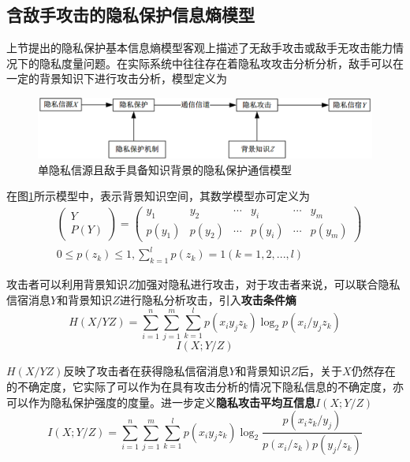 \subsection{含敌手攻击的隐私保护信息熵模型}\label{subsec:privacy-preserving-attack}

上节提出的隐私保护基本信息熵模型客观上描述了无敌手攻击或敌手无攻击能力情况下的隐私度量问题。在实际系统中往往存在着隐私攻攻击分析分析，敌手可以在一定的背景知识下进行攻击分析，模型定义为
\begin{figure}[htbp]
	\centering
	\includegraphics[width = 0.95\linewidth]{./figures/Communication-Model-for-Privacy-of-Single.png}
	\caption{单隐私信源且敌手具备知识背景的隐私保护通信模型}
	\label{fig:Communication-Model-for-Privacy-of-Single}
\end{figure}

在图\ref{fig:Communication-Model-for-Privacy-of-Single}所示模型中，表示背景知识空间，其数学模型亦可定义为
\begin{equation}
\begin{split}
&\begin{pmatrix}
Y\\ 
P(Y)
\end{pmatrix}=\begin{pmatrix}
y_{1} & y_{2} & \cdots  & y_{i} & \cdots  & y_{m}\\ 
p(y_{1})& p(y_{2}) & \cdots & p(y_{i}) & \cdots & p(y_{m})
\end{pmatrix} \\
&0 \leqslant p(z_{k})\leqslant 1,\sum_{k=1}^{l}p(z_{k})=1(k=1,2,...,l)
\end{split}
\end{equation}

攻击者可以利用背景知识$Z$加强对隐私进行攻击，对于攻击者来说，可以联合隐私信宿消息$Y$和背景知识$Z$进行隐私分析攻击，引入\textbf{攻击条件熵}
\begin{equation}
H(X/YZ)=\sum_{i=1}^{n}\sum_{j=1}^{m}\sum_{k=1}^{l}p(x_{i}y_{j}z_{k})\log_{2}p(x_{i}/y_{j}z_{k})
\end{equation}
\begin{equation*}
I(X;Y/Z)
\end{equation*}

$H(X/YZ)$反映了攻击者在获得隐私信宿消息$Y$和背景知识$Z$后，关于$X$仍然存在的不确定度，它实际了可以作为在具有攻击分析的情况下隐私信息的不确定度，亦可以作为隐私保护强度的度量。进一步定义\textbf{隐私攻击平均互信息}$I(X;Y/Z)$
\begin{equation}
I(X;Y/Z)=\sum_{i=1}^{n}\sum_{j=1}^{m}\sum_{k=1}^{l}p(x_{i}y_{j}z_{k})\log_{2}\frac{p(x_{i}z_{k}/y_{j})}{p(x_{i}/z_{k})p(y_{j}/z_{k})}
\end{equation}

